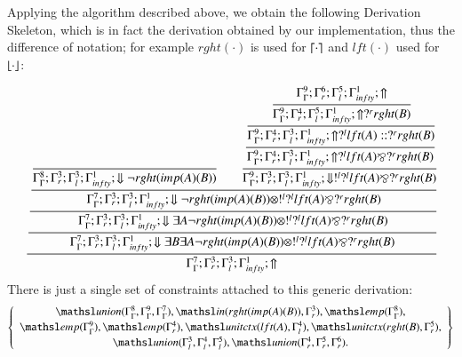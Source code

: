 \documentclass{ebl}
\newcommand{\elin}[2]{\ensuremath{{\tsl{unitctx}(\ensuremath{#1}, \ensuremath{#2})}}}
\newcommand{\emp}[1]{\ensuremath{{\tsl{emp}(\ensuremath{#1})}}}
\newcommand{\union}[3]{\ensuremath{{\tsl{union}(\ensuremath{#1},\ensuremath{#2},\ensuremath{ #3})}}}
\newcommand{\In}[2]{\ensuremath{\tsl{in}(\ensuremath{#1},\ensuremath{#2})}}
\begin{document}
Applying the algorithm described above, we obtain the following Derivation Skeleton, which is in fact the 
derivation obtained by our implementation, thus the difference of notation; for example $rght(\cdot)$ is used for
$\lceil \cdot \rceil$ and $lft(\cdot)$ used for $\lfloor \cdot \rfloor$:

{\small
\[
\cfrac{\cfrac{\cfrac{\cfrac{\cfrac{}
{\Gamma_{ \Gamma}^{8} ; \Gamma_{r}^{3} ; \Gamma_{l}^{3} ; \Gamma_{ infty}^{1} ;  \Downarrow \neg rght (imp (A) (B) )   }
\qquad
\cfrac{\cfrac{\cfrac{\cfrac{\Gamma_{ \Gamma}^{9} ; \Gamma_{r}^{6} ; \Gamma_{l}^{5} ; \Gamma_{ infty}^{1} ;  \Uparrow }
{\Gamma_{ \Gamma}^{9} ; \Gamma_{r}^{4} ; \Gamma_{l}^{5} ; \Gamma_{ infty}^{1} ;  \Uparrow  ?^{r} rght (B)   }}
{\Gamma_{ \Gamma}^{9} ; \Gamma_{r}^{4} ; \Gamma_{l}^{3} ; \Gamma_{ infty}^{1} ;  \Uparrow  ?^{l} lft (A)  ::  ?^{r} rght (B)   }}
{\Gamma_{ \Gamma}^{9} ; \Gamma_{r}^{4} ; \Gamma_{l}^{3} ; \Gamma_{ infty}^{1} ;  \Uparrow  ?^{l} lft (A)  \bindnasrepma  ?^{r} rght (B)   }}
{\Gamma_{ \Gamma}^{9} ; \Gamma_{r}^{3} ; \Gamma_{l}^{3} ; \Gamma_{ infty}^{1} ;  \Downarrow  !^{l}  ?^{l} lft (A)  \bindnasrepma  ?^{r} rght (B)   }}
{\Gamma_{ \Gamma}^{7} ; \Gamma_{r}^{3} ; \Gamma_{l}^{3} ; \Gamma_{ infty}^{1} ;  \Downarrow \neg rght (imp (A) (B) )  \otimes  !^{l}  ?^{l} lft (A)  \bindnasrepma  ?^{r} rght (B)   }}
{\Gamma_{ \Gamma}^{7} ; \Gamma_{r}^{3} ; \Gamma_{l}^{3} ; \Gamma_{ infty}^{1} ;  \Downarrow \exists A \neg rght (imp (A) (B) )  \otimes  !^{l}  ?^{l} lft (A)  \bindnasrepma  ?^{r} rght (B)   }}
{\Gamma_{ \Gamma}^{7} ; \Gamma_{r}^{3} ; \Gamma_{l}^{3} ; \Gamma_{ infty}^{1} ;  \Downarrow \exists B \exists A \neg rght (imp (A) (B) )  \otimes  !^{l}  ?^{l} lft (A)  \bindnasrepma  ?^{r} rght (B)   }}
{\Gamma_{ \Gamma}^{7} ; \Gamma_{r}^{3} ; \Gamma_{l}^{3} ; \Gamma_{ infty}^{1} ;  \Uparrow }
\]
}
There is just a single set of constraints attached to this generic derivation:
\[
 \left\{\begin{array}{c}
  \union{\Gamma_{ \Gamma}^{8}}{\Gamma_{ \Gamma}^{9}}{\Gamma_{ \Gamma}^{7}}, \In{rght (imp (A) (B)) }{ \Gamma_{r}^{3}}, 
  \emp{\Gamma_{ \Gamma}^{8}},\\[2pt]
  \emp{\Gamma_{ \Gamma}^{9}}, \emp{\Gamma_{r}^{4}},\elin{lft (A)}{ \Gamma_{l}^{4}},
  \elin{rght (B)}{ \Gamma_{r}^{5}},\\[2pt]
  \union{\Gamma_{l}^{3}} {\Gamma_{l}^{4}} {\Gamma_{l}^{5}},\union{\Gamma_{r}^{4}}{\Gamma_{r}^{5} } {\Gamma_{r}^{6}}.
 \end{array}\right\}
\]
\end{document}
